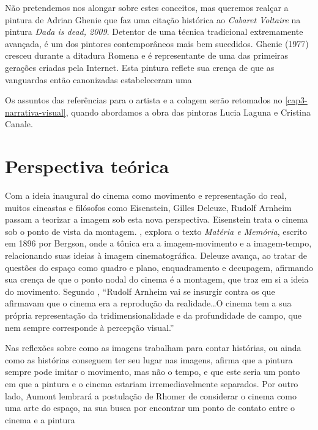 Não pretendemos nos alongar sobre estes  conceitos, mas queremos realçar
a pintura de Adrian Ghenie que faz uma citação histórica ao
\emph{Cabaret Voltaire} na pintura \emph{Dada is dead, 2009}. Detentor
de uma técnica tradicional extremamente avançada, é um dos pintores
contemporâneos mais bem sucedidos. Ghenie (1977) cresceu durante a
ditadura Romena e é representante de uma das primeiras gerações criadas
pela Internet. Esta pintura reflete sua crença de que as vanguardas
então canonizadas estabeleceram uma

Os assuntos das referências para o artista e a colagem serão retomados
no \cref{cap3-narrativa-visual}, quando abordamos a obra das pintoras
Lucia Laguna e Cristina Canale.

\section{Perspectiva teórica}%
\label{perspectiva-teuxf3rica}

Com a ideia inaugural do cinema como movimento e representação do real,
muitos cineastas e filósofos como Eisenstein, Gilles Deleuze, Rudolf
Arnheim passam a teorizar a imagem sob esta nova perspectiva.
Eisenstein trata o cinema sob o ponto de vista da montagem.
\textcite{deleuze2004imagem}, explora o texto \emph{Matéria e Memória},
escrito em 1896 por Bergson, onde a tônica era a imagem-movimento e a
imagem-tempo, relacionando suas ideias à imagem cinematográfica.
Deleuze avança, ao tratar de questões do espaço como quadro e plano,
enquadramento e decupagem, afirmando sua crença de que o ponto nodal do
cinema é a montagem, que traz em si a ideia do movimento. Segundo
\textcite[49--50]{gil2005atmosfera}, \enquote{Rudolf Arnheim vai se
	insurgir contra os que afirmavam que o cinema era a reprodução da
	realidade\ldots O cinema tem a sua própria representação da
	tridimensionalidade e da profundidade de campo, que nem sempre
	corresponde à percepção visual.}

Nas reflexões sobre como as imagens trabalham para contar histórias, ou
ainda como as histórias conseguem ter seu lugar nas imagens,
\textcite{aumont2004olho} afirma que a pintura sempre pode imitar o
movimento, mas não o tempo, e que este seria um ponto em que a pintura
e o cinema estariam irremediavelmente separados. Por outro lado, Aumont
lembrará a postulação de Rhomer de considerar o cinema como uma arte do
espaço, na sua busca por encontrar um ponto de contato entre o cinema e
a pintura

